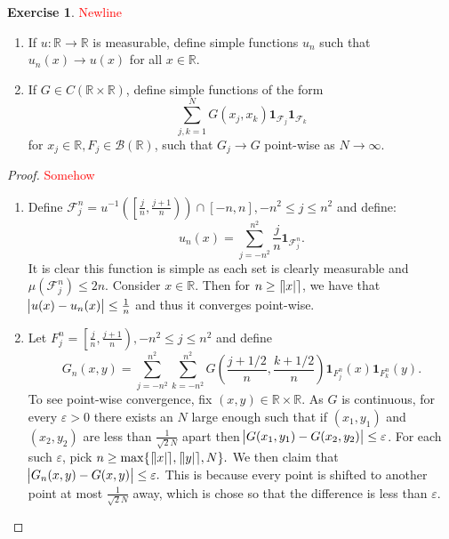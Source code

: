 \documentclass{amsart}
\theoremstyle{plain}
\theoremstyle{definition}
\newtheorem{exer}{Exercise}[section]
\newcommand{\R}{\mathbb{R}}
\newcommand{\tcr}[1]{\textcolor{red}{#1}}
\begin{document}
\begin{exer}
\tcr{Newline}
    \begin{enumerate}[label=\alph*.]
        \item If $u:\R\to\R$ is measurable, define simple functions $u_n$ such that $u_n(x) \to u(x)$ for all $x\in\R.$
        \item If $G\in C\left(\R\times \R\right)$, define simple functions of the form
        $$\sum_{j,k=1}^{N} G(x_j,x_k)\mathbf{1}_{\mathcal{F}_j}\mathbf{1}_{\mathcal{F}_k}$$
        for $x_j\in\R, F_j \in \mathcal{B}\left(\R\right)$, such that $G_j\to G$ point-wise as $N\to \infty.$
    \end{enumerate}
\end{exer}
\begin{proof}\tcr{Somehow}
    \begin{enumerate}[label=\alph*.]
        \item Define $\mathcal{F}_{j}^{n} = u^{-1}\left(\left[\frac{j}{n},\frac{j+1}{n}\right)\right)\cap\left[-n,n\right], -n^2 \leq j \leq n^2$ and define:
        $$u_n(x) = \sum_{j=-n^2}^{n^2} \frac{j}{n}\mathbf{1}_{\mathcal{F}_{j}^{n}}.$$
        It is clear this function is simple as each set is clearly measurable and $\mu\left(\mathcal{F}_j^n\right)\leq 2n$. Consider $x\in \R$. Then for $n\geq \lceil \abs{x}\rceil$, we have that $\abs{u(x)-u_{n}(x)}\leq \frac{1}{n}$ and thus it converges point-wise.
        \item Let $F_j^n = \left[\frac{j}{n},\frac{j+1}{n}\right), -n^2 \leq j \leq n^2$ and define 
        $$G_n(x,y) = \sum_{j=-n^2}^{n^2}\sum_{k=-n^2}^{n^2} G\left(\frac{j+1/2}{n},\frac{k+1/2}{n}\right)\mathbf{1}_{F_j^n}(x)\mathbf{1}_{F_k^n}(y).$$
        To see point-wise convergence, fix $(x,y) \in \R\times\R.$ As $G$ is continuous, for every $\varepsilon>0$ there exists an $N$ large enough such that if $(x_1,y_1)$ and $(x_2,y_2)$ are less than $\frac{1}{\sqrt{2}N}$ apart then $\abs{G(x_1,y_1)-G(x_2,y_2)}\leq \varepsilon$. For each such $\varepsilon$, pick $n \geq \max\{\lceil \abs{x}\rceil, \lceil \abs{y} \rceil, N\}.$ We then claim that $\abs{G_n(x,y)-G(x,y)}\leq \varepsilon.$ This is because every point is shifted to another point at most $\frac{1}{\sqrt{2}N}$ away, which is chose so that the difference is less than $\varepsilon.$
    \end{enumerate}
\end{proof}
\end{document}
